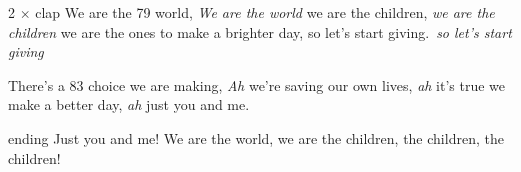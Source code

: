 \documentclass[10pt]{article}
\begin{document}
\begin{guitar}
    {\tiny 2 $\times$ clap}
    We are the {\tiny 79} world, \emph{We are the world}
    we are the children, \emph{we are the children}
    we are the ones to make a brighter day,
    so let's start giving. \emph{so let's start giving}

    There's a {\tiny 83} choice we are making, \emph{Ah}
    we're saving our own lives, \emph{ah}
    it's true we make a better day, \emph{ah}
    just you and me.

    {\tiny ending}
    Just you and me!
    We are the world,
    we are the children,
    the children, the children!

\end{guitar}
\end{document}
